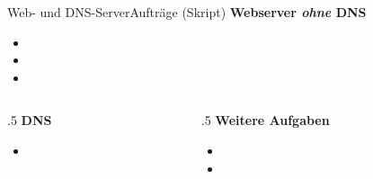 \begin{frame}[fragile]{Web- und \acrshort{DNS}-Server}{Aufträge (Skript)}
    \textbf{Webserver \textit{ohne} \gls{DNS}}
    \begin{itemize}
        \item {}
        \item {}
        \item {}
    \end{itemize}
    \begin{columns}[t]
        \begin{column}{.5\textwidth}
            \textbf{\gls{DNS}}
            \begin{itemize}
                \item {}
            \end{itemize}
        \end{column}
        \begin{column}{.5\textwidth}
            \textbf{Weitere Aufgaben}
            \begin{itemize}
                \item {}
                \item {}
            \end{itemize}
        \end{column}
    \end{columns}
\end{frame}